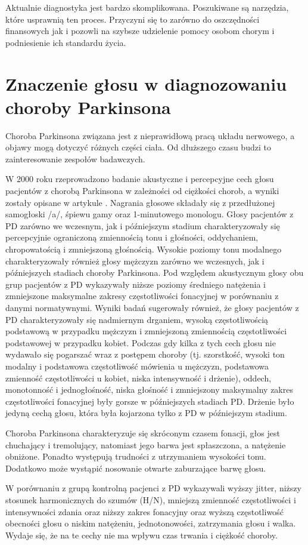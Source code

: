 Aktualnie diagnostyka jest bardzo skomplikowana. Poszukiwane są narzędzia, które usprawnią ten proces.
Przyczyni się to zarówno do oszczędności finansowych jak i pozowli na szybsze udzielenie pomocy osobom chorym i podniesienie ich standardu życia. 


\section{Znaczenie głosu w diagnozowaniu choroby Parkinsona}
\label{sec:znaczenie_glosu}

Choroba Parkinsona związana jest z nieprawidłową pracą układu nerwowego, a objawy mogą dotyczyć różnych części ciała.
Od dłuższego czasu budzi to zainteresowanie zespołów badawczych.

W 2000 roku rzeprowadzono badanie akustyczne i percepcyjne cech głosu pacjentów z chorobą Parkinsona w zależności od
ciężkości chorob, a wyniki zostały opisane w artykule \cite{https://doi.org/10.1080/136828200410654}.
Nagrania głosowe składały się z przedłużonej samogłoski /a/, śpiewu gamy oraz 1-minutowego monologu.
Głosy pacjentów z PD zarówno we wczesnym, jak i późniejszym stadium charakteryzowały się percepcyjnie ograniczoną
zmiennością tonu i głośności, oddychaniem, chropowatością i zmniejszoną głośnością.
Wysokie poziomy tonu modalnego charakteryzowały również głosy mężczyzn zarówno we wczesnych, jak i późniejszych stadiach choroby Parkinsona.
Pod względem akustycznym głosy obu grup pacjentów z PD wykazywały niższe poziomy średniego natężenia i zmniejszone
maksymalne zakresy częstotliwości fonacyjnej w porównaniu z danymi normatywnymi.
Wyniki badań sugerowały również, że głosy pacjentów z PD charakteryzowały się nadmiernym drganiem, wysoką częstotliwością
podstawową w przypadku mężczyzn i zmniejszoną zmiennością częstotliwości podstawowej w przypadku kobiet.
Podczas gdy kilka z tych cech głosu nie wydawało się pogarszać wraz z postępem choroby (tj. szorstkość, wysoki ton modalny
i podstawowa częstotliwość mówienia u mężczyzn, podstawowa zmienność częstotliwości u kobiet, niska intensywność i drżenie),
oddech, monotonność i jednogłośność, niska głośność i zmniejszony maksymalny zakres częstotliwości fonacyjnej były gorsze w
późniejszych stadiach PD. Drżenie było jedyną cechą głosu, która była kojarzona tylko z PD w późniejszym stadium.


Choroba Parkinsona charakteryzuje się skróconym czasem fonacji, głos jest chuchający i tremolujący, natomiast jego barwa jest
spłaszczona, a natężenie obniżone.
Ponadto występują trudności z utrzymaniem wysokości tonu.
Dodatkowo może wystąpić nosowanie otwarte zaburzające barwę głosu\cite{Kuryłowicz_2019}.

W porównaniu z grupą kontrolną pacjenci z PD wykazywali wyższy jitter, niższy stosunek harmonicznych do szumów (H/N),
mniejszą zmienność częstotliwości i intensywności zdania oraz niższy zakres fonacyjny oraz wyższą częstotliwość obecności
głosu o niskim natężeniu, jednotonowości, zatrzymania głosu i walka.
Wydaje się, że na te cechy nie ma wpływu czas trwania i ciężkość choroby. \cite{GAMBOA1997314}
